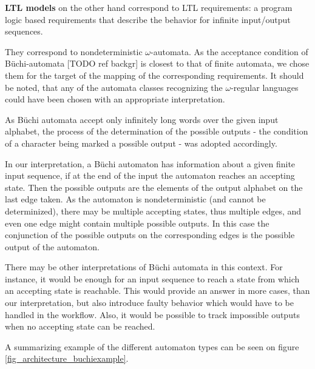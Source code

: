 
\textbf{LTL models} on the other hand correspond to LTL requirements: a program logic based requirements that describe the behavior for infinite input/output sequences.%

They correspond to nondeterministic $\omega$-automata. As the acceptance condition of Büchi-automata [TODO ref backgr] is closest to that of finite automata, we chose them for the target of the mapping of the corresponding requirements. It should be noted, that any of the automata classes recognizing the $\omega$-regular languages could have been chosen with an appropriate interpretation.

As Büchi automata accept only infinitely long words over the given input alphabet, the process of the determination of the possible outputs - the condition of a character being marked a possible output - was adopted accordingly.

In our interpretation, a Büchi automaton has information about a given finite input sequence, if at the end of the input the automaton reaches an accepting state. Then the possible outputs are the elements of the output alphabet on the last edge taken. As the automaton is nondeterministic (and cannot be determinized), there may be multiple accepting states, thus multiple edges, and even one edge might contain multiple possible outputs. In this case the conjunction of the possible outputs on the corresponding edges is the possible output of the automaton.  

There may be other interpretations of Büchi automata in this context. For instance, it would be enough for an input sequence to reach a state from which an accepting state is reachable. This would provide an answer in more cases, than our interpretation, but also introduce faulty behavior which would have to be handled in the workflow. Also, it would be possible to track impossible outputs when no accepting state can be reached.

A summarizing example of the different automaton types can be seen on figure \ref{fig_architecture_buchiexample}.

